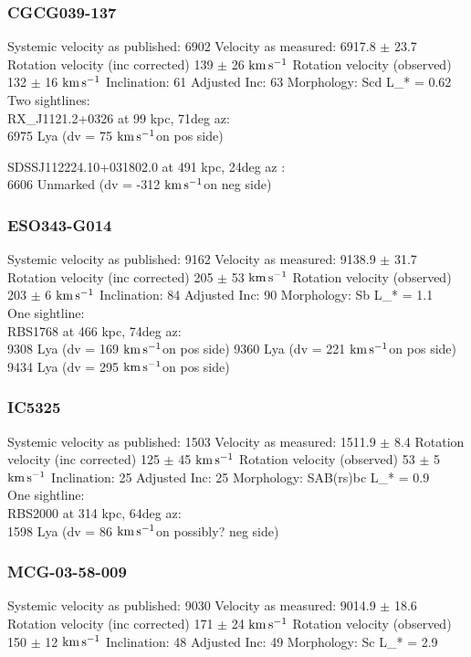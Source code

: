 \documentclass[iop]{emulateapj-rtx4}
\newcommand{\kms}{$\rm km\, s^{-1}$}
\begin{document}
\subsubsection{CGCG039-137}
Systemic velocity as published: 6902
Velocity as measured: 6917.8 $\pm$ 23.7
Rotation velocity (inc corrected) 139 $\pm$ 26 \kms
Rotation velocity (observed) 132 $\pm$ 16 \kms
Inclination: 61
Adjusted Inc: 63
Morphology: Scd
L_{\**} = 0.62 \\

Two sightlines: \\
RX_J1121.2+0326 at 99 kpc, 71deg az: \\
6975 Lya (dv = 75 \kms on pos side)

SDSSJ112224.10+031802.0 at 491 kpc, 24deg az : \\
6606 Unmarked (dv = -312 \kms on neg side)



\subsubsection{ESO343-G014}
Systemic velocity as published: 9162
Velocity as measured: 9138.9 $\pm$ 31.7
Rotation velocity (inc corrected) 205 $\pm$ 53 \kms
Rotation velocity (observed) 203 $\pm$ 6 \kms
Inclination: 84
Adjusted Inc: 90
Morphology: Sb
L_{\**} = 1.1 \\

One sightline: \\
RBS1768 at 466 kpc, 74deg az: \\
9308 Lya (dv = 169 \kms on pos side)
9360 Lya (dv = 221 \kms on pos side)
9434 Lya (dv = 295 \kms on pos side)


\subsubsection{IC5325}
Systemic velocity as published: 1503
Velocity as measured: 1511.9 $\pm$ 8.4
Rotation velocity (inc corrected) 125 $\pm$ 45 \kms
Rotation velocity (observed) 53 $\pm$ 5 \kms
Inclination: 25
Adjusted Inc: 25
Morphology: SAB(rs)bc
L_{\**} = 0.9 \\

One sightline: \\
RBS2000 at 314 kpc, 64deg az: \\
1598 Lya (dv = 86 \kms on possibly? neg side)


\subsubsection{MCG-03-58-009}
Systemic velocity as published: 9030
Velocity as measured: 9014.9 $\pm$ 18.6
Rotation velocity (inc corrected) 171 $\pm$ 24 \kms
Rotation velocity (observed) 150 $\pm$ 12 \kms
Inclination: 48
Adjusted Inc: 49
Morphology: Sc
L_{\**} = 2.9 \\
\end{document}
